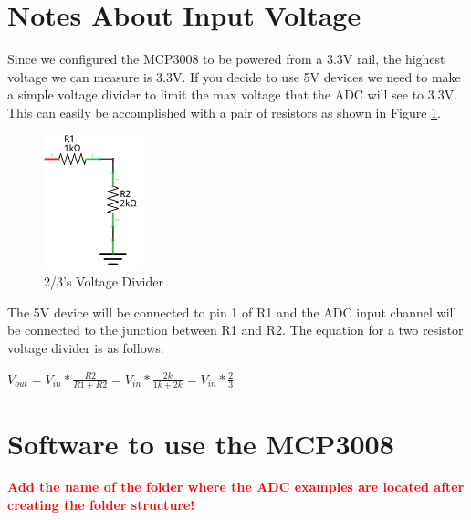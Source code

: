 \documentclass{article}
\begin{document}
\section{Notes About Input Voltage}

Since we configured the MCP3008 to be powered from a 3.3V rail, the highest voltage we can measure is 3.3V. If you decide to use 5V devices we need to make a simple voltage divider to limit the max voltage that the ADC will see to 3.3V. This can easily be accomplished with a pair of resistors as shown in Figure \ref{Voltage_Divider}.

 
	\begin{figure}[H]
		\centering
		\includegraphics[width=0.25\textwidth]{pics/Voltage_Divider.png}
		\caption{2/3's Voltage Divider}
		\label{Voltage_Divider}
	\end{figure}

The 5V device will be connected to pin 1 of R1 and the ADC input channel will be connected to the junction between R1 and R2. The equation for a two resistor voltage divider is as follows:

	\begin{center}
		\begin{math}
		V_{out} = V_{in} * \frac{R2}{R1 + R2} = V_{in} * \frac{2k}{1k + 2k} = V_{in} * \frac{2}{3}
		\end{math}
	\end{center}


\section{Software to use the MCP3008}

\textbf{\textcolor{red}{Add the name of the folder where the ADC examples are located after creating the folder structure!}}





	
	







\end{document}
